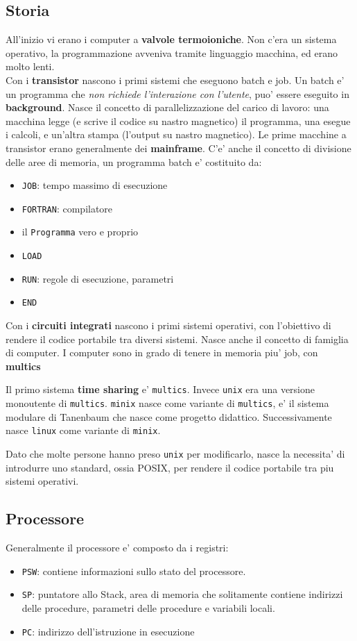 \subsection{Storia}
All'inizio vi erano i computer a \textbf{valvole termoioniche}. Non c'era un 
sistema operativo, la programmazione avveniva tramite linguaggio macchina, ed erano molto lenti. \\

Con i \textbf{transistor} nascono i primi sistemi che eseguono batch e job.
Un batch e' un programma che \emph{non richiede l'interazione con l'utente}, puo' essere
eseguito in \textbf{background}.
Nasce il concetto di parallelizzazione del carico di lavoro: una macchina legge (e scrive il codice su nastro magnetico) il programma,
una esegue i calcoli, e un'altra stampa (l'output su nastro magnetico).
Le prime macchine a transistor erano generalmente dei \textbf{mainframe}.
C'e' anche il concetto di divisione delle aree di memoria, un programma batch e' costituito da:
\begin{itemize}
    \item \texttt{JOB}: tempo massimo di esecuzione
    \item \texttt{FORTRAN}: compilatore
    \item il \texttt{Programma} vero e proprio
    \item \texttt{LOAD}
    \item \texttt{RUN}: regole di esecuzione, parametri
    \item \texttt{END}
\end{itemize}

Con i \textbf{circuiti integrati} nascono i primi sistemi operativi, con
l'obiettivo di rendere il codice portabile tra diversi sistemi.
Nasce anche il concetto di famiglia di computer.
I computer sono in grado di tenere in memoria piu' job, con \textbf{multics} 

Il primo sistema \textbf{time sharing} e' \texttt{multics}. Invece \texttt{unix} 
era una versione monoutente di \texttt{multics}. \texttt{minix} nasce come variante di
\texttt{multics}, e' il sistema modulare di Tanenbaum che nasce come progetto didattico.
Successivamente nasce \texttt{linux} come variante di \texttt{minix}.

Dato che molte persone hanno preso \texttt{unix} per modificarlo, nasce la necessita' 
di introdurre uno standard, ossia POSIX, per rendere il codice portabile tra piu sistemi operativi.

\subsection{Processore}
Generalmente il processore e' composto da i registri:
\begin{itemize}
    \item \texttt{PSW}: contiene informazioni sullo stato del processore.
    \item \texttt{SP}: puntatore allo Stack, area di memoria che solitamente contiene indirizzi delle procedure, 
    parametri delle procedure e variabili locali.
    \item \texttt{PC}: indirizzo dell'istruzione in esecuzione
\end{itemize}

